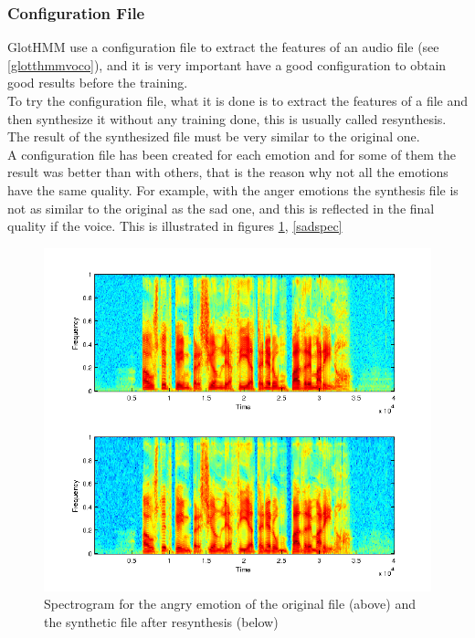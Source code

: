 \subsubsection{Configuration File}\label{cfile}
GlotHMM use a configuration file to extract the features of an audio file (see \ref{glotthmmvoco}), and it is very important have a good configuration to obtain good results before the training.\\
To try the configuration file, what it is done is to extract the features of a file and then synthesize it without any training done, this is usually called resynthesis. The result of the synthesized file must be very similar to the original one.\\
A configuration file has been created for each emotion and for some of them the result was better than with others, that is the reason why not all the emotions have the same quality. For example, with the anger emotions the synthesis file is not as similar to the original as the sad one, and this is reflected in the final quality if the voice. This is illustrated in figures \ref{angryspec}, \ref{sadspec}\\
\begin{figure}[!htb]
	\begin{center}
	\includegraphics[width=1\textwidth]{img/spectro-ang.png}
	\end{center}
	\caption{\label{angryspec}Spectrogram for the angry emotion of the original file (above) and the synthetic file after resynthesis (below)}
\end{figure}
